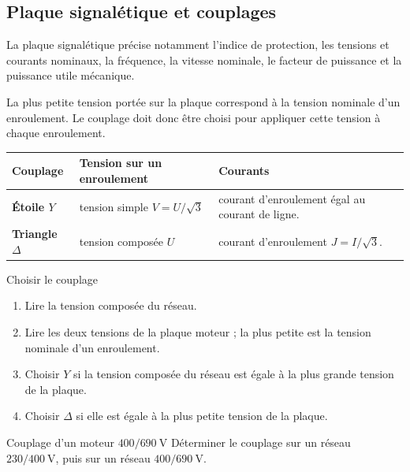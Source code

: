 \subsection{Plaque signalétique et couplages}

La plaque signalétique précise notamment l'indice de protection, les tensions et courants nominaux, la fréquence, la vitesse nominale, le facteur de puissance et la puissance utile mécanique.

La plus petite tension portée sur la plaque correspond à la tension nominale d'un enroulement. Le couplage doit donc être choisi pour appliquer cette tension à chaque enroulement.

\begin{center}\TLCouplagesEtoileTriangle\end{center}

\begin{center}
\small
\begin{tabularx}{\linewidth}{>{\bfseries}l X X}
\toprule
Couplage & Tension sur un enroulement & Courants \\
\midrule
Étoile $Y$ & tension simple $V=U/\sqrt3$ & courant d'enroulement égal au courant de ligne.\\
Triangle $\Delta$ & tension composée $U$ & courant d'enroulement $J=I/\sqrt3$.\\
\bottomrule
\end{tabularx}
\end{center}


\begin{TLMachineMethod}{Choisir le couplage}
\begin{enumerate}
  \item Lire la tension composée du réseau.
  \item Lire les deux tensions de la plaque moteur ; la plus petite est la tension nominale d'un enroulement.
  \item Choisir $Y$ si la tension composée du réseau est égale à la plus grande tension de la plaque.
  \item Choisir $\Delta$ si elle est égale à la plus petite tension de la plaque.
\end{enumerate}
\end{TLMachineMethod}

\begin{TLMachineExercise}{Couplage d'un moteur $400/690\ \mathrm V$}
Déterminer le couplage sur un réseau $230/400\ \mathrm V$, puis sur un réseau $400/690\ \mathrm V$.
\end{TLMachineExercise}

